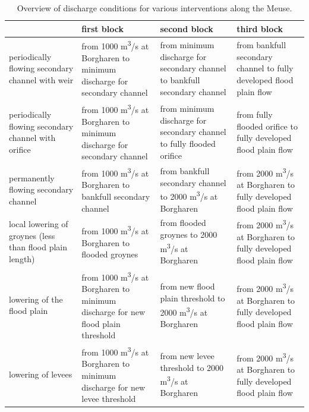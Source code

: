 \begin{table}
\begin{tabular}{p{}|p{}|p{}|p{}}
 & first block & second block & third block \\ \hline
periodically flowing secondary channel with weir & from 1000 m\textsuperscript{3}/s at Borgharen to minimum discharge for secondary channel & from minimum discharge for secondary channel to bankfull secondary channel & from bankfull secondary channel to fully developed flood plain flow \\ \hline
periodically flowing secondary channel with orifice & from 1000 m\textsuperscript{3}/s at Borgharen to minimum discharge for secondary channel & from minimum discharge for secondary channel to fully flooded orifice & from fully flooded orifice to fully developed flood plain flow \\ \hline
permanently flowing secondary channel & from 1000 m\textsuperscript{3}/s at Borgharen to bankfull secondary channel & from bankfull secondary channel to 2000 m\textsuperscript{3}/s at Borgharen & from 2000 m\textsuperscript{3}/s at Borgharen to fully developed flood plain flow \\ \hline
local lowering of groynes (less than flood plain length) & from 1000 m\textsuperscript{3}/s at Borgharen to flooded groynes & from flooded groynes to 2000 m\textsuperscript{3}/s at Borgharen & from 2000 m\textsuperscript{3}/s at Borgharen to fully developed flood plain flow \\ \hline
lowering of the flood plain & from 1000 m\textsuperscript{3}/s at Borgharen to minimum discharge for new flood plain threshold & from new flood plain threshold to 2000 m\textsuperscript{3}/s at Borgharen & from 2000 m\textsuperscript{3}/s at Borgharen to fully developed flood plain flow \\ \hline
lowering of levees & from 1000 m\textsuperscript{3}/s at Borgharen to minimum discharge for new levee threshold & from new levee threshold to 2000 m\textsuperscript{3}/s at Borgharen & from 2000 m\textsuperscript{3}/s at Borgharen to fully developed flood plain flow \\
\end{tabular}

\caption{Overview of discharge conditions for various interventions along the Meuse.}
\label{App.Tab3}
\end{table}

